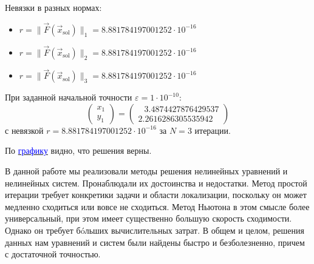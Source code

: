 		Невязки в разных нормах:
		\begin{itemize}
			\item $r = \|\vec{F}(\vec{x}_\text{sol})\|_{1} = 8.881784197001252 \cdot 10^{-16}$
			
			\item $r = \|\vec{F}(\vec{x}_\text{sol})\|_{2} = 8.881784197001252 \cdot 10^{-16}$
			
			\item $r = \|\vec{F}(\vec{x}_\text{sol})\|_{3} = 8.881784197001252 \cdot 10^{-16}$
		\end{itemize}
		
		При заданной начальной точности $\varepsilon = 1 \cdot 10^{-10}$:
		\begin{equation*}
			\begin{pmatrix}
				x_1 \\
				y_1
			\end{pmatrix} = 
			\begin{pmatrix}
				\;\;\, 3.4874427876429537 \\
				2.2616286305535942
			\end{pmatrix}
		\end{equation*}
		\noindent с невязкой $r = 8.881784197001252 \cdot 10^{-16}$ за $N = 3$ итерации.
		
		По \hyperref[System2]{\textcolor{blue}{графику}} видно, что решения верны.
		
		\newpage
		В данной работе мы реализовали методы решения нелинейных уравнений и нелинейных систем. Пронаблюдали их достоинства и недостатки. Метод простой итерации требует конкретики задачи и области локализации, поскольку он может медленно сходиться или вовсе не сходиться. Метод Ньютона в этом смысле более универсальный, при этом имеет существенно большую скорость сходимости. Однако он требует бóльших вычислительных затрат. В общем и целом, решения данных нам уравнений и систем были найдены быстро и безболезненно, причем с достаточной точностью.
	
